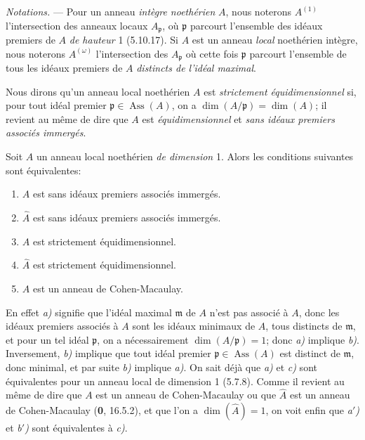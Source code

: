 \begin{env}[7.2.1]
\label{IV.2.s7.2.1-fr}
\emph{Notations.} --- Pour un anneau \emph{intègre noethérien} $A$, nous noterons
$A^{(1)}$ l'intersection des anneaux locaux $A_{\mathfrak p}$, où
$\mathfrak p$ parcourt l'ensemble des idéaux premiers de $A$ \emph{de hauteur} 1
(5.10.17). Si $A$ est un anneau \emph{local} noethérien intègre, nous noterons
$A^{(\omega)}$ l'intersection des $A_{\mathfrak p}$ où cette fois
$\mathfrak p$ parcourt l'ensemble de tous les idéaux premiers de $A$
\emph{distincts de l'idéal maximal}.

Nous dirons qu'un anneau local noethérien $A$ est \emph{strictement
équidimensionnel} si, pour tout idéal premier
$\mathfrak p\in\operatorname{Ass}(A)$, on a
$\dim(A/\mathfrak p)=\dim(A)$; il revient au même de dire que $A$ est
\emph{équidimensionnel} et \emph{sans idéaux premiers associés immergés}.
\end{env}

\begin{example}[7.2.1.1]
\label{IV.2.s7.2.1.1-fr}
Soit $A$ un anneau local noethérien \emph{de dimension} 1. Alors les
conditions suivantes sont équivalentes:
\begin{enumerate}
\item[\emph{a)}] $A$ est sans idéaux premiers associés immergés.
\item[\emph{a$'$)}] $\widehat A$ est sans idéaux premiers associés immergés.
\item[\emph{b)}] $A$ est strictement équidimensionnel.
\item[\emph{b$'$)}] $\widehat A$ est strictement équidimensionnel.
\item[\emph{c)}] $A$ est un anneau de Cohen-Macaulay.
\end{enumerate}
\end{example}

En effet \emph{a)} signifie que l'idéal maximal $\mathfrak m$ de $A$ n'est pas
associé à $A$, donc les idéaux premiers associés à $A$ sont les idéaux
minimaux de $A$, tous distincts de $\mathfrak m$, et
pour un tel idéal $\mathfrak p$, on a nécessairement
$\dim(A/\mathfrak p)=1$; donc \emph{a)} implique \emph{b)}. Inversement, \emph{b)} implique que
tout idéal premier $\mathfrak p\in\operatorname{Ass}(A)$ est distinct de
$\mathfrak m$, donc minimal, et par suite \emph{b)} implique \emph{a)}. On sait déjà que
\emph{a)} et \emph{c)} sont équivalentes pour un anneau local de dimension 1 (5.7.8).
Comme il revient au même de dire que $A$ est un anneau de Cohen-Macaulay ou
que $\widehat A$ est un anneau de Cohen-Macaulay (\textbf{0}, 16.5.2), et que l'on
a $\dim(\widehat A)=1$, on voit enfin que \emph{a$'$)} et \emph{b$'$)} sont équivalentes à
\emph{c)}.

